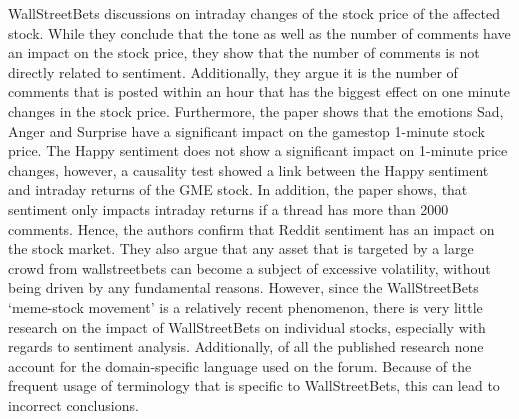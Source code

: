 \documentclass[11pt, a4paper]{article}
\begin{document}
WallStreetBets discussions on intraday changes of the stock price of the affected stock. While they conclude that the tone as well as the number of 
comments have an impact on the stock price, they show that the number of comments is not directly related to sentiment. Additionally, they argue it 
is the number of comments that is posted within an hour that has the biggest effect on one minute changes in the stock price. Furthermore, the paper 
shows that the emotions Sad, Anger and Surprise have a significant impact on the gamestop 1-minute stock price. The Happy sentiment does not show a 
significant impact on 1-minute price changes, however, a causality test showed a link between the Happy sentiment and intraday returns of the GME stock. 
In addition, the paper shows, that sentiment only impacts intraday returns if a thread has more than 2000 comments. Hence, the authors confirm that Reddit 
sentiment has an impact on the stock market. They also argue that any asset that is targeted by a large crowd from wallstreetbets can become a subject 
of excessive volatility, without being driven by any fundamental reasons.
However, since the WallStreetBets ‘meme-stock movement’ is a relatively recent phenomenon, there is very little research on the impact of 
WallStreetBets on individual stocks, especially with regards to sentiment analysis. Additionally, of all the published research none account 
for the domain-specific language used on the forum. Because of the frequent usage of terminology that is specific to WallStreetBets, 
this can lead to incorrect conclusions.
\end{document}
